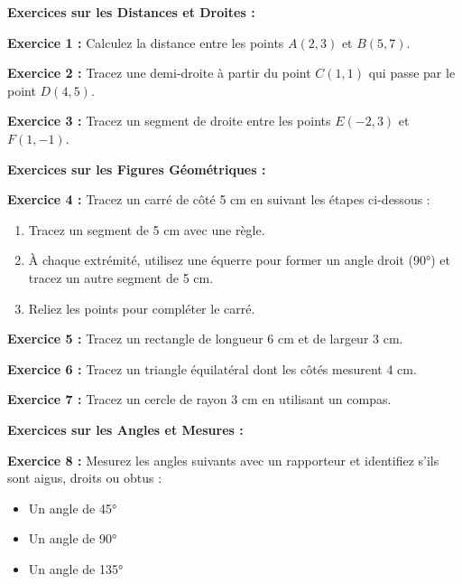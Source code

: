 \documentclass{article}
\begin{document}
\begin{tcolorbox}[colback=yellow!10!white, colframe=yellow!75!black, title=\textcolor{white}{Exercices}, sharp corners=south]
    
    \textbf{Exercices sur les Distances et Droites :}
    
    \vspace{5pt}
    
    \textbf{Exercice 1 :} Calculez la distance entre les points \(A(2, 3)\) et \(B(5, 7)\).
    
    \textbf{Exercice 2 :} Tracez une demi-droite à partir du point \(C(1, 1)\) qui passe par le point \(D(4, 5)\).
    
    \textbf{Exercice 3 :} Tracez un segment de droite entre les points \(E(-2, 3)\) et \(F(1, -1)\).
    
    \vspace{10pt}
    
    \textbf{Exercices sur les Figures Géométriques :}
    
    \vspace{5pt}
    
    \textbf{Exercice 4 :} Tracez un carré de côté 5 cm en suivant les étapes ci-dessous :
    \begin{enumerate}
        \item Tracez un segment de 5 cm avec une règle.
        \item À chaque extrémité, utilisez une équerre pour former un angle droit (90°) et tracez un autre segment de 5 cm.
        \item Reliez les points pour compléter le carré.
    \end{enumerate}
    
    \textbf{Exercice 5 :} Tracez un rectangle de longueur 6 cm et de largeur 3 cm.
    
    \textbf{Exercice 6 :} Tracez un triangle équilatéral dont les côtés mesurent 4 cm.
    
    \textbf{Exercice 7 :} Tracez un cercle de rayon 3 cm en utilisant un compas.
    
    \vspace{10pt}
    
    \textbf{Exercices sur les Angles et Mesures :}
    
    \vspace{5pt}
    
    \textbf{Exercice 8 :} Mesurez les angles suivants avec un rapporteur et identifiez s'ils sont aigus, droits ou obtus :
    \begin{itemize}
        \item Un angle de 45°
        \item Un angle de 90°
        \item Un angle de 135°
    \end{itemize}
    

\end{tcolorbox}
\end{document}
